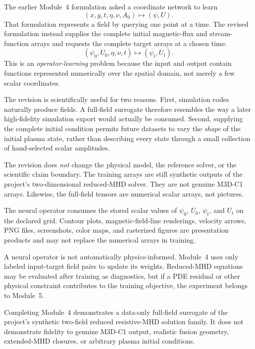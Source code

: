 \documentclass[11pt]{article}
\begin{document}
The earlier Module~4 formulation asked a coordinate network to learn
\[
(x,y,t,\eta,\nu,A_0)\mapsto(\psi,U).
\]
That formulation represents a field by querying one point at a time. The revised formulation instead supplies the complete initial magnetic-flux and stream-function arrays and requests the complete target arrays at a chosen time:
\[
\left(\psi_0,U_0,\eta,\nu,t\right)\mapsto(\psi_t,U_t).
\]
This is an \emph{operator-learning} problem because the input and output contain functions represented numerically over the spatial domain, not merely a few scalar coordinates.

The revision is scientifically useful for two reasons. First, simulation codes naturally produce fields. A full-field surrogate therefore resembles the way a later high-fidelity simulation export would actually be consumed. Second, supplying the complete initial condition permits future datasets to vary the \emph{shape} of the initial plasma state, rather than describing every state through a small collection of hand-selected scalar amplitudes.

The revision does \emph{not} change the physical model, the reference solver, or the scientific claim boundary. The training arrays are still synthetic outputs of the project's two-dimensional reduced-MHD solver. They are not genuine M3D-C1 arrays. Likewise, the full-field tensors are numerical scalar arrays, not pictures.

\begin{warningbox}
The neural operator consumes the stored scalar values of $\psi_0$, $U_0$, $\psi_t$, and $U_t$ on the declared grid. Contour plots, magnetic-field-line renderings, velocity arrows, PNG files, screenshots, color maps, and rasterized figures are presentation products and may not replace the numerical arrays in training.
\end{warningbox}

\begin{warningbox}
A neural operator is not automatically physics-informed. Module~4 uses only labeled input-target field pairs to update its weights. Reduced-MHD equations may be evaluated after training as diagnostics, but if a PDE residual or other physical constraint contributes to the training objective, the experiment belongs to Module~5.
\end{warningbox}

\begin{warningbox}
Completing Module~4 demonstrates a data-only full-field surrogate of the project's synthetic two-field reduced resistive-MHD solution family. It does not demonstrate fidelity to genuine M3D-C1 output, realistic fusion geometry, extended-MHD closures, or arbitrary plasma initial conditions.
\end{warningbox}
\end{document}
